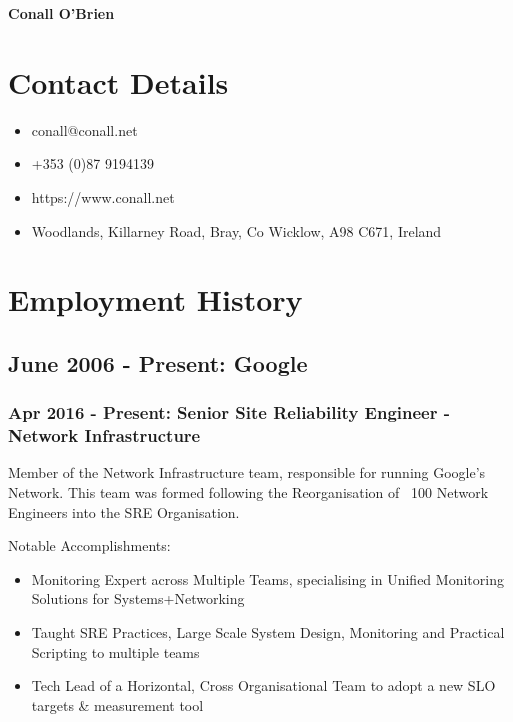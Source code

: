 \documentclass[a4paper, 10pt] {article}
\begin{document}
\begingroup
  \centering
  \LARGE \textbf{Conall O'Brien}\\[1.5em]
\endgroup

\section*{Contact Details}

\begin{itemize}[itemsep=2pt,parsep=2pt]
 \item conall@conall.net
 \item +353 (0)87 9194139
 \item https://www.conall.net
 \item Woodlands, Killarney Road, Bray, Co Wicklow, A98 C671, Ireland
\end{itemize}

\section*{Employment History}

\subsection*{June 2006 - Present: Google}

\subsubsection*{Apr 2016 - Present: Senior Site Reliability Engineer - Network Infrastructure}

Member of the Network Infrastructure team, responsible for running Google's Network. This team was formed
following the Reorganisation of ~100 Network Engineers into the SRE Organisation.

\vspace{5mm} %

Notable Accomplishments:

\begin{itemize}[itemsep=2pt,parsep=2pt]
  \item Monitoring Expert across Multiple Teams, specialising in Unified Monitoring Solutions for Systems+Networking
  \item Taught SRE Practices, Large Scale System Design, Monitoring and Practical Scripting to multiple teams
  \item Tech Lead of a Horizontal, Cross Organisational Team to adopt a new SLO targets \& measurement tool
\end{itemize}
\end{document}
